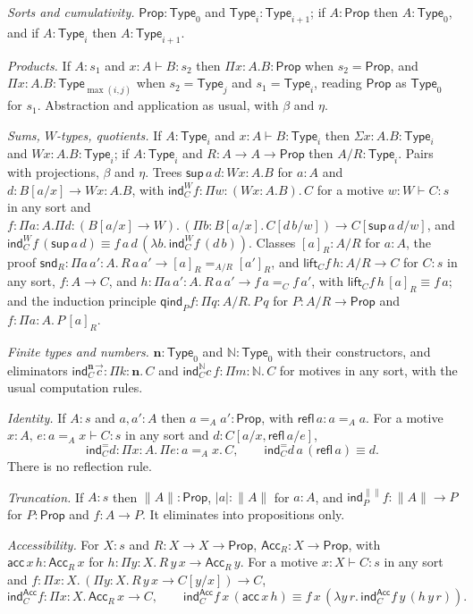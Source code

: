 \documentclass[10pt]{article}
\newcommand{\N}{\mathbb{N}}
\newcommand{\Prop}{\mathsf{Prop}}
\newcommand{\Type}{\mathsf{Type}}
\newcommand{\ind}{\mathsf{ind}}
\newcommand{\Acc}{\mathsf{Acc}}
\newcommand{\refl}{\mathsf{refl}}
\begin{document}
\emph{Sorts and cumulativity.} $\Prop:\Type_0$ and $\Type_i:\Type_{i+1}$;
if $A:\Prop$ then $A:\Type_0$, and if $A:\Type_i$ then $A:\Type_{i+1}$.

\emph{Products.} If $A:s_1$ and $x{:}A\vdash B:s_2$ then
$\Pi x{:}A.B:\Prop$ when $s_2=\Prop$, and $\Pi x{:}A.B:\Type_{\max(i,j)}$
when $s_2=\Type_j$ and $s_1=\Type_i$, reading $\Prop$ as $\Type_0$ for
$s_1$. Abstraction and application as usual, with $\beta$ and $\eta$.

\emph{Sums, $W$-types, quotients.} If $A:\Type_i$ and
$x{:}A\vdash B:\Type_i$ then $\Sigma x{:}A.B:\Type_i$ and
$Wx{:}A.B:\Type_i$; if $A:\Type_i$ and $R:A\to A\to\Prop$ then
$A/R:\Type_i$. Pairs with projections, $\beta$ and $\eta$. Trees
$\mathsf{sup}\,a\,d:Wx{:}A.B$ for $a:A$ and $d:B[a/x]\to Wx{:}A.B$, with
$\ind^W_Cf:\Pi w{:}(Wx{:}A.B).\,C$ for a motive $w{:}W\vdash C:s$ in any
sort and
$f:\Pi a{:}A.\Pi d{:}(B[a/x]\to W).\,(\Pi b{:}B[a/x].\,C[d\,b/w])\to C[\mathsf{sup}\,a\,d/w]$,
and $\ind^W_Cf\,(\mathsf{sup}\,a\,d)\equiv f\,a\,d\,(\lambda b.\,\ind^W_Cf\,(d\,b))$.
Classes $[a]_R:A/R$ for $a:A$, the proof
$\mathsf{snd}_R:\Pi a\,a'{:}A.\,R\,a\,a'\to[a]_R=_{A/R}[a']_R$, and
$\mathsf{lift}_Cf\,h:A/R\to C$ for $C:s$ in any sort, $f:A\to C$, and
$h:\Pi a\,a'{:}A.\,R\,a\,a'\to f\,a=_Cf\,a'$, with
$\mathsf{lift}_Cf\,h\,[a]_R\equiv f\,a$; and the induction principle
$\mathsf{qind}_Pf:\Pi q{:}A/R.\,P\,q$ for $P:A/R\to\Prop$ and
$f:\Pi a{:}A.\,P\,[a]_R$.

\emph{Finite types and numbers.} $\mathbf n:\Type_0$ and $\N:\Type_0$ with
their constructors, and eliminators $\ind^{\mathbf n}_C\vec c:\Pi k{:}\mathbf n.\,C$
and $\ind^\N_Cc\,f:\Pi m{:}\N.\,C$ for motives in any sort, with the
usual computation rules.

\emph{Identity.} If $A:s$ and $a,a':A$ then $a=_Aa':\Prop$, with
$\refl\,a:a=_Aa$. For a motive $x{:}A,\,e{:}a=_Ax\vdash C:s$ in any sort
and $d:C[a/x,\refl\,a/e]$,
\[
\ind^=_Cd:\Pi x{:}A.\,\Pi e{:}a=_Ax.\,C,\qquad
\ind^=_Cd\,a\,(\refl\,a)\equiv d .
\]
There is no reflection rule.

\emph{Truncation.} If $A:s$ then $\|A\|:\Prop$, $|a|:\|A\|$ for $a:A$, and
$\ind^{\|\|}_Pf:\|A\|\to P$ for $P:\Prop$ and $f:A\to P$. It eliminates
into propositions only.

\emph{Accessibility.} For $X:s$ and $R:X\to X\to\Prop$,
$\Acc_R:X\to\Prop$, with
$\mathsf{acc}\,x\,h:\Acc_R\,x$ for $h:\Pi y{:}X.\,R\,y\,x\to\Acc_R\,y$. For a
motive $x{:}X\vdash C:s$ in any sort and
$f:\Pi x{:}X.\,(\Pi y{:}X.\,R\,y\,x\to C[y/x])\to C$,
\[
\ind^{\Acc}_Cf:\Pi x{:}X.\,\Acc_R\,x\to C,\qquad
\ind^{\Acc}_Cf\,x\,(\mathsf{acc}\,x\,h)\equiv f\,x\,(\lambda y\,r.\,\ind^{\Acc}_Cf\,y\,(h\,y\,r)).
\]
\end{document}
